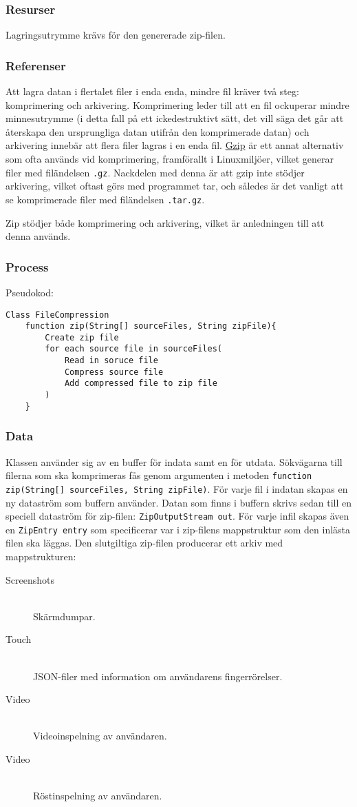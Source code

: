 \subsubsection{Resurser}
Lagringsutrymme krävs för den genererade zip-filen. 

\subsubsection{Referenser}
Att lagra datan i flertalet filer i enda enda, mindre fil kräver två steg: komprimering och arkivering. Komprimering leder till att en fil ockuperar mindre minnesutrymme (i detta fall på ett ickedestruktivt sätt, det vill säga det går att återskapa den ursprungliga datan utifrån den komprimerade datan) och arkivering innebär att flera filer lagras i en enda fil. \href{http://en.wikipedia.org/wiki/Gzip}{Gzip} är ett annat alternativ som ofta används vid komprimering, framförallt i Linuxmiljöer, vilket generar filer med filändelsen \verb:.gz:. Nackdelen med denna är att gzip inte stödjer arkivering, vilket oftast görs med programmet tar, och således är det vanligt att se komprimerade filer med filändelsen \verb:.tar.gz:. 

Zip stödjer både komprimering och arkivering, vilket är anledningen till att denna används. 

\subsubsection{Process}
Pseudokod: 
\begin{verbatim}
Class FileCompression
	function zip(String[] sourceFiles, String zipFile){
		Create zip file
		for each source file in sourceFiles(
			Read in soruce file
			Compress source file
			Add compressed file to zip file	
		)
	}
\end{verbatim}

\subsubsection{Data}
Klassen använder sig av en buffer för indata samt en för utdata. Sökvägarna till filerna som ska komprimeras fås genom argumenten i metoden \verb:function zip(String[] sourceFiles, String zipFile):. För varje fil i indatan skapas en ny dataström som buffern använder. Datan som finns i buffern skrivs sedan till en speciell dataström för zip-filen: \verb:ZipOutputStream out:. För varje infil skapas även en \verb:ZipEntry entry: som specificerar var i zip-filens mappstruktur som den inlästa filen ska läggas. Den slutgiltiga zip-filen producerar ett arkiv med mappstrukturen:
\begin{description}
  \item[Screenshots] \hfill \\
  	Skärmdumpar.
  \item[Touch] \hfill \\
  	JSON-filer med information om användarens fingerrörelser.
  \item[Video] \hfill \\
  	Videoinspelning av användaren.
  \item[Video] \hfill \\
  	Röstinspelning av användaren.
\end{description}